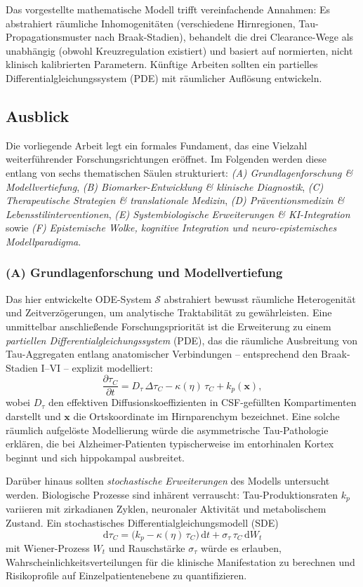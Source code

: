 ﻿\documentclass[12pt,a4paper]{article}
\theoremstyle{definition}
\begin{document}
	Das vorgestellte mathematische Modell trifft vereinfachende Annahmen: Es abstrahiert räumliche Inhomogenitäten (verschiedene Hirnregionen, Tau-Propagationsmuster nach Braak-Stadien), behandelt die drei Clearance-Wege als unabhängig (obwohl Kreuzregulation existiert) und basiert auf normierten, nicht klinisch kalibrierten Parametern. Künftige Arbeiten sollten ein partielles Differentialgleichungssystem (PDE) mit räumlicher Auflösung entwickeln.
	
	\subsection{Ausblick}

	Die vorliegende Arbeit legt ein formales Fundament, das eine Vielzahl weiterführender Forschungsrichtungen eröffnet. Im Folgenden werden diese entlang von sechs thematischen Säulen strukturiert: \emph{(A) Grundlagenforschung \& Modellvertiefung}, \emph{(B) Biomarker-Entwicklung \& klinische Diagnostik}, \emph{(C) Therapeutische Strategien \& translationale Medizin}, \emph{(D) Präventionsmedizin \& Lebensstilinterventionen}, \emph{(E) Systembiologische Erweiterungen \& KI-Integration} sowie \emph{(F) Epistemische Wolke, kognitive Integration und neuro-epistemisches Modellparadigma}.

	\subsubsection*{(A) Grundlagenforschung und Modellvertiefung}

	Das hier entwickelte ODE-System $\mathcal{S}$ abstrahiert bewusst räumliche Heterogenität und Zeitverzögerungen, um analytische Traktabilität zu gewährleisten. Eine unmittelbar anschließende Forschungspriorität ist die Erweiterung zu einem \emph{partiellen Differentialgleichungssystem} (PDE), das die räumliche Ausbreitung von Tau-Aggregaten entlang anatomischer Verbindungen -- entsprechend den Braak-Stadien I--VI -- explizit modelliert:
	\[
	\frac{\partial \tau_C}{\partial t} = D_\tau \,\Delta \tau_C - \kappa(\eta)\,\tau_C + k_p(\mathbf{x}),
	\]
	wobei $D_\tau$ den effektiven Diffusionskoeffizienten in CSF-gefüllten Kompartimenten darstellt und $\mathbf{x}$ die Ortskoordinate im Hirnparenchym bezeichnet. Eine solche räumlich aufgelöste Modellierung würde die asymmetrische Tau-Pathologie erklären, die bei Alzheimer-Patienten typischerweise im entorhinalen Kortex beginnt und sich hippokampal ausbreitet.

	Darüber hinaus sollten \emph{stochastische Erweiterungen} des Modells untersucht werden. Biologische Prozesse sind inhärent verrauscht: Tau-Produktionsraten $k_p$ variieren mit zirkadianen Zyklen, neuronaler Aktivität und metabolischem Zustand. Ein stochastisches Differentialgleichungsmodell (SDE)
	\[
	\mathrm{d}\tau_C = \bigl(k_p - \kappa(\eta)\,\tau_C\bigr)\,\mathrm{d}t + \sigma_\tau\,\tau_C\,\mathrm{d}W_t
	\]
	mit Wiener-Prozess $W_t$ und Rauschstärke $\sigma_\tau$ würde es erlauben, Wahrscheinlichkeitsverteilungen für die klinische Manifestation zu berechnen und Risikoprofile auf Einzelpatientenebene zu quantifizieren.
\end{document}
